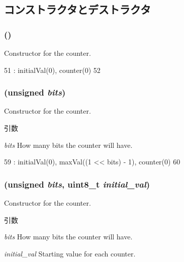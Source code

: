 \subsection{コンストラクタとデストラクタ}
\hypertarget{classSatCounter_af4fd8672acdaf7df4e65f0bf22569d75}{
\subsubsection[{SatCounter}]{ ()}}
\label{classSatCounter_af4fd8672acdaf7df4e65f0bf22569d75}
Constructor for the counter. 


\begin{DoxyCode}
51         : initialVal(0), counter(0)
52     { }
\end{DoxyCode}
\hypertarget{classSatCounter_a5d3cda6b8fda91df5a98232d3fe7199f}{
\subsubsection[{SatCounter}]{ (unsigned {\em bits})}}
\label{classSatCounter_a5d3cda6b8fda91df5a98232d3fe7199f}
Constructor for the counter. 
\begin{DoxyParams}{引数}
\item[{\em bits}]How many bits the counter will have. \end{DoxyParams}



\begin{DoxyCode}
59         : initialVal(0), maxVal((1 << bits) - 1), counter(0)
60     { }
\end{DoxyCode}
\hypertarget{classSatCounter_a3ecba692e26af744ab286b255ed62786}{
\subsubsection[{SatCounter}]{ (unsigned {\em bits}, \/  uint8\_\-t {\em initial\_\-val})}}
\label{classSatCounter_a3ecba692e26af744ab286b255ed62786}
Constructor for the counter. 
\begin{DoxyParams}{引数}
\item[{\em bits}]How many bits the counter will have. \item[{\em initial\_\-val}]Starting value for each counter. \end{DoxyParams}



